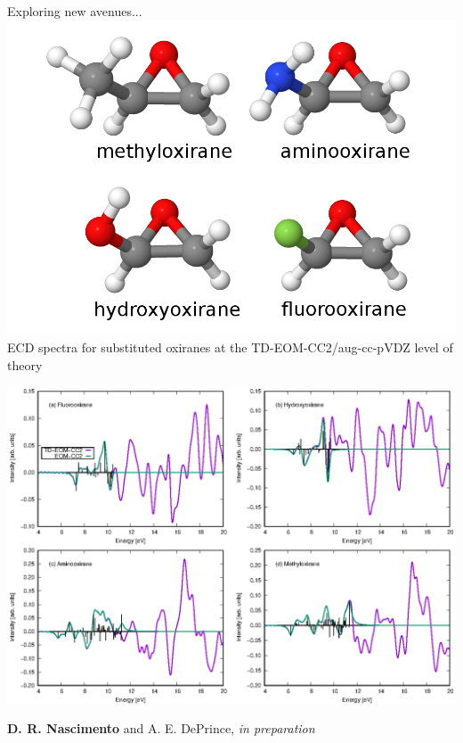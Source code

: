 \documentclass{beamer}
\begin{document}
\begin{frame}{Exploring new avenues...}
\hspace{230pt}
\vspace{-20pt}
\includegraphics[scale=0.3]{figures/ecd_molecules.png}
\vspace{-20pt}
ECD spectra for substituted oxiranes at the TD-EOM-CC2/aug-cc-pVDZ level of theory 
\vspace{5pt}
\begin{center}
  \includegraphics[scale=0.5]{figures/ecd_velocity_final.eps}
\end{center}
\footnotesize{{\bf D. R. Nascimento} and A. E. DePrince, {\it in preparation}}
\end{frame}
\end{document}
